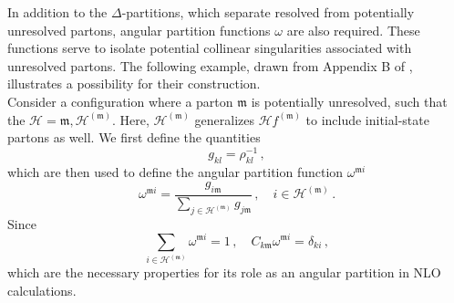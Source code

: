 \documentclass[a4paper, 12pt]{book}
\newcommand{\um}{\mathfrak{m}}
\begin{document}
\begin{appendices}
In addition to the $\Delta$-partitions, which separate resolved from potentially unresolved partons, angular partition functions $\omega$ are also required. These functions serve to isolate potential collinear singularities associated with unresolved partons. The following example, drawn from Appendix B of \cite{Devoto:2023rpv}, illustrates a possibility for their construction. \\
Consider a configuration where a parton $\um$ is potentially unresolved, such that the $\mathcal{H}={\um,\mathcal{H}^{(\um)}}$. Here, $\mathcal{H}^{(\um)}$ generalizes $\mathcal{H}f^{(\um)}$ to include initial-state partons as well. We first define the quantities
\begin{equation}
  g_{kl} = \rho_{kl}^{-1} \, ,
\end{equation}
which are then used to define the angular partition function $\omega^{\um i}$ 
\begin{equation}
  \omega^{\um i} = \frac{g_{i\um}}{\sum_{j \in \mathcal{H}^{(\um)}} g_{j\um}}  \,, \quad i \in \mathcal{H}^{(\um)} \, .
  \label{omega-definition}
\end{equation}
Since
\begin{equation}
  \sum_{i \in \mathcal{H}^{(\um)}} \omega^{\um i} = 1 \,, \quad C_{k\um} \omega^{\um i} = \delta_{ki} \, ,
\end{equation}
which are the necessary properties for its role as an angular partition in NLO calculations.


\end{appendices}
\end{document}
